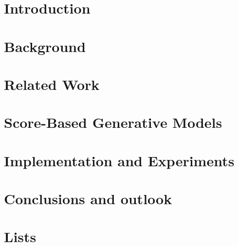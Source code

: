 \documentclass[a4paper, 12pt, oneside, BCOR=0cm]{scrbook}
\begin{document}
\mainmatter
\chapter{Introduction}


\chapter{Background}





\chapter{Related Work}



\chapter{Score-Based Generative Models} %





\chapter{Implementation and Experiments} \label{chap:5}



\chapter{Conclusions and outlook} %
\appendix 
\chapter{Lists}
\listoffigures
\listoftables

\listofalgorithms


\end{document}
